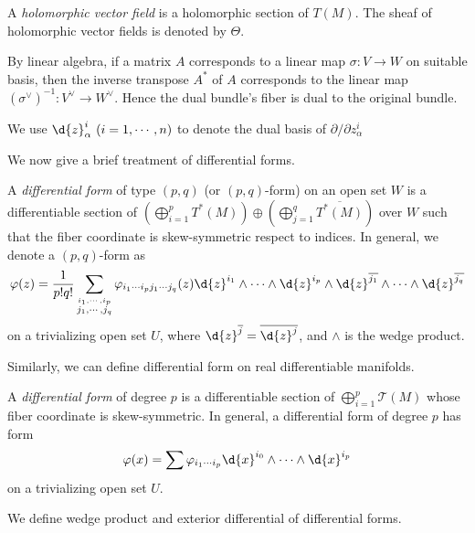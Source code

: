 \begin{defn}
    A \emph{holomorphic vector field} is a holomorphic section of $T(M)$.
    The sheaf of holomorphic vector fields is denoted by $\Theta$. 
\end{defn}

By linear algebra, if a matrix $A$ corresponds to a linear map $\sigma:V\to W$ on suitable basis, then the inverse transpose $A^*$ of $A$ corresponds to the linear map $(\sigma^\vee)^{-1}:V^\vee\to W^\vee$.
Hence the dual bundle's fiber is dual to the original bundle.
\begin{sym}
    We use $\d{z}_\alpha^i\ (i=1,\cdots,n)$ to denote the dual basis of $\partial/\partial{z_\alpha^i}$
\end{sym}

We now give a brief treatment of differential forms.
\begin{defn}
    A \emph{differential form} of type $(p,q)$ (or $(p,q)$-form) on an open set $W$ is a differentiable section of $\left(\bigoplus_{i=1}^pT^*(M)\right)\oplus\left(\bigoplus_{j=1}^q\overline{T^*(M)}\right)$ over $W$ such that the fiber coordinate is skew-symmetric respect to indices.
    In general, we denote a $(p,q)$-form as
    \[\varphi(z)=\frac{1}{p!q!}\sum_{\stackrel{i_1,\cdots,i_p}{j_1,\cdots,j_q}}\varphi_{i_1\cdots i_pj_1\cdots j_q}(z)\d{z}^{i_1}\wedge\cdots\wedge\d{z}^{i_p}\wedge\d{z}^{\overline{j_1}}\wedge\cdots\wedge\d{z}^{\overline{j_q}}\]
    on a trivializing open set $U$, where $\d{z}^{\overline{j}}=\overline{\d{z}^j}$, and $\wedge$ is the wedge product.
\end{defn}

Similarly, we can define differential form on real differentiable manifolds.
\begin{defn}
    A \emph{differential form} of degree $p$ is a differentiable section of $\bigoplus_{i=1}^p\mathcal{T}(M)$ whose fiber coordinate is skew-symmetric.
    In general, a differential form of degree $p$ has form
    \[\varphi(x)=\sum\varphi_{i_1\cdots i_p}\d{x}^{i_0}\wedge\cdots\wedge\d{x}^{i_p}\]
    on a trivializing open set $U$.
\end{defn}

We define wedge product and exterior differential of differential forms.

